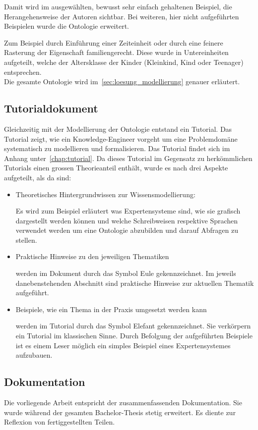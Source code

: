 Damit wird im ausgewählten, bewusst sehr einfach gehaltenen Beispiel, die Herangehensweise der Autoren sichtbar. Bei weiteren, hier nicht aufgeführten Beispielen wurde die Ontologie erweitert.

Zum Beispiel durch Einführung einer Zeiteinheit oder durch eine feinere Rasterung der Eigenschaft familiengerecht. Diese wurde in Untereinheiten aufgeteilt, welche der Altersklasse der Kinder (Kleinkind, Kind oder Teenager) entsprechen.\\
Die gesamte Ontologie wird im~\autoref{sec:loesung_modellierung} genauer erläutert.

\subsection{Tutorialdokument}
\label{subsec:dokumentation_wissensmodellierung}
Gleichzeitig mit der Modellierung der Ontologie entstand ein Tutorial. Das Tutorial zeigt, wie ein Knowledge-Engineer vorgeht um eine Problemdomäne systematisch zu modellieren und formalisieren. Das Tutorial findet sich im Anhang unter~\ref{chap:tutorial}. Da dieses  Tutorial im Gegensatz zu herkömmlichen Tutorials einen grossen Theorieanteil enthält, wurde es nach drei Aspekte aufgeteilt, als da sind:
\begin{itemize}
    \item Theoretisches Hintergrundwissen zur Wissensmodellierung:

        Es wird zum Beispiel erläutert was Expertensysteme sind, wie sie grafisch dargestellt werden können und welche Schreibweisen respektive Sprachen verwendet werden um eine Ontologie abzubilden und darauf Abfragen zu stellen.

    \item Praktische Hinweise zu den jeweiligen Thematiken

        werden im Dokument durch das Symbol Eule gekennzeichnet. Im jeweils danebenstehenden Abschnitt sind praktische Hinweise zur aktuellen Thematik aufgeführt.

    \item Beispiele, wie ein Thema in der Praxis umgesetzt werden kann

        werden im Tutorial durch das Symbol Elefant gekennzeichnet. Sie verkörpern ein Tutorial im klassischen Sinne. Durch Befolgung der aufgeführten Beispiele ist es einem Leser möglich ein simples Beispiel eines Expertensystemes aufzubauen.
\end{itemize}

\subsection{Dokumentation}
\label{subsec:abschliessende_dokumentation}
Die vorliegende Arbeit entspricht der zusammenfassenden Dokumentation. Sie wurde während der gesamten Bachelor-Thesis stetig erweitert. Es diente zur Reflexion von fertiggestellten Teilen.
